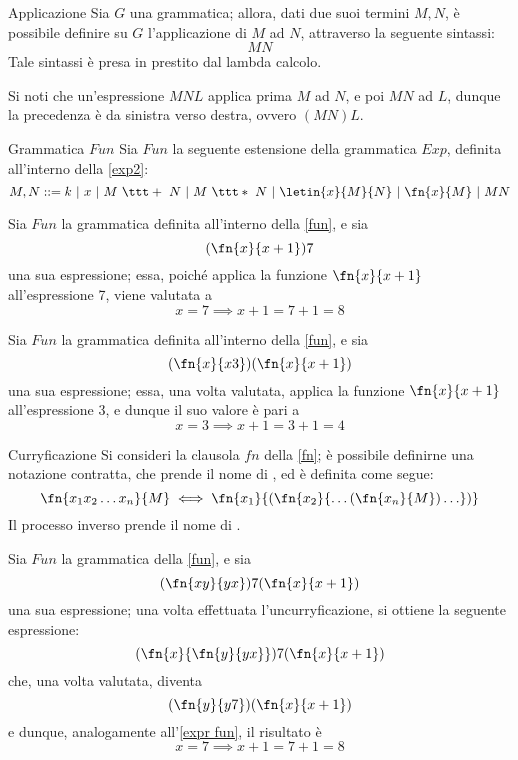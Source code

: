 \documentclass[a4paper, 12pt]{report}
\begin{document}
    \begin{frameddefn}{Applicazione}
        Sia $G$ una grammatica; allora, dati due suoi termini $M,N$, è possibile definire su $G$ l'applicazione di $M$ ad $N$, attraverso la seguente sintassi: $$MN$$ Tale sintassi è presa in prestito dal lambda calcolo.

        Si noti che un'espressione $MNL$ applica prima $M$ ad $N$, e poi $MN$ ad $L$, dunque la precedenza è da sinistra verso destra, ovvero $(MN)L$.
    \end{frameddefn}

    \begin{frameddefn}[label={fun}]{Grammatica $Fun$}
        Sia $Fun$ la seguente estensione della grammatica $Exp$, definita all'interno della \cref{exp2}: $$M,N ::= k \ | \ x \ | \ M \ \ttt + \ N \ | \ M \ \ttt * \ N \ | \ \letin{x}{M}{N} \ | \ \fn{x}{M} \ | \ MN$$
    \end{frameddefn}

    \begin{example}
        Sia $Fun$ la grammatica definita all'interno della \cref{fun}, e sia $$(\fn{x}{x +1})7$$ una sua espressione; essa, poiché applica la funzione $\fn{x}{x+1}$ all'espressione 7, viene valutata a $$x = 7 \implies x + 1= 7 + 1 = 8$$
    \end{example}

    \begin{example}
        \label{expr fun}
        Sia $Fun$ la grammatica definita all'interno della \cref{fun}, e sia $$(\fn{x}{x3})(\fn{x}{x+1})$$ una sua espressione; essa, una volta valutata, applica la funzione $\fn{x}{x+1}$ all'espressione 3, e dunque il suo valore è pari a $$x = 3 \implies x + 1 = 3 + 1 = 4$$
    \end{example}

    \begin{frameddefn}{Curryficazione}
        Si consideri la clausola $fn$ della \cref{fn}; è possibile definirne una notazione contratta, che prende il nome di , ed è definita come segue: $$\fn{x_1x_2 \ldots x_n}{M} \iff \fn{x_1}{(\fn{x_2}{\ldots (\fn{x_n}{M}) \ldots})}$$ Il processo inverso prende il nome di .
    \end{frameddefn}

    \begin{example}[Curryficazioni]
        Sia $Fun$ la grammatica della \cref{fun}, e sia $$(\fn{xy}{yx})7(\fn{x}{x+1})$$ una sua espressione; una volta effettuata l'uncurryficazione, si ottiene la seguente espressione: $$(\fn{x}{\fn{y}{yx}})7(\fn{x}{x+1})$$ che, una volta valutata, diventa $$(\fn{y}{y7})(\fn{x}{x+1})$$ e dunque, analogamente all'\cref{expr fun}, il risultato è $$x= 7 \implies x+1 = 7 + 1= 8$$
    \end{example}
\end{document}
